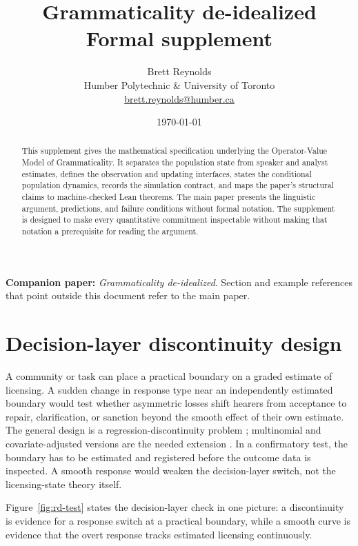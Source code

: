 \documentclass[12pt,letterpaper]{article}
\title{Grammaticality de-idealized\\[0.4em]\large Formal supplement}
\author{}
\date{}
\author{Brett Reynolds \orcidlink{0000-0003-0073-7195}\\
    Humber Polytechnic \& University of Toronto\\
    \href{mailto:brett.reynolds@humber.ca}{brett.reynolds@humber.ca}}
\date{\today}
\begin{document}
\maketitle

\begin{abstract}
This supplement gives the mathematical specification underlying the
Operator-Value Model of Grammaticality. It separates the population state from
speaker and analyst estimates, defines the observation and updating interfaces,
states the conditional population dynamics, records the simulation contract,
and maps the paper's structural claims to machine-checked Lean theorems. The
main paper presents the linguistic argument, predictions, and failure conditions
without formal notation. The supplement is designed to make every quantitative
commitment inspectable without making that notation a prerequisite for reading
the argument.
\end{abstract}

\noindent\textbf{Companion paper:} \emph{Grammaticality de-idealized}. Section
and example references that point outside this document refer to the main paper.

\tableofcontents
\newpage







\section{Decision-layer discontinuity design}
\label{sec:decision-layer-discontinuity}

A community or task can place a practical boundary on a graded estimate of
licensing. A sudden change in response type near an independently estimated
boundary would test whether asymmetric losses shift hearers from acceptance to
repair, clarification, or sanction beyond the smooth effect of their own
estimate. The general design is a regression-discontinuity problem
\autocite{LeeLemieux2010,CalonicoCattaneoTitiunik2014}; multinomial and
covariate-adjusted versions are the needed extension \autocite{Lazzaro2026}. In
a confirmatory test, the boundary has to be estimated and registered before the
outcome data is inspected. A smooth response would weaken the decision-layer
switch, not the licensing-state theory itself.

Figure~\ref{fig:rd-test} states the decision-layer check in one picture: a
discontinuity is evidence for a response switch at a practical boundary, while
a smooth curve is evidence that the overt response tracks estimated licensing
continuously.
\end{document}
